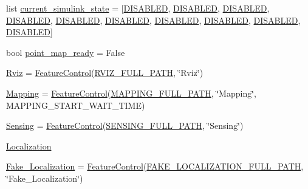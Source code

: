 \begin{DoxyCompactItemize}
list \hyperlink{namespacerp__manager_a85cdd1b22b56bd5cc90234794b44872c}{current\+\_\+simulink\+\_\+state} = \mbox{[}\hyperlink{namespacerp__manager_af85e17f72f768eba5168eba56041bd69}{D\+I\+S\+A\+B\+L\+ED}, \hyperlink{namespacerp__manager_af85e17f72f768eba5168eba56041bd69}{D\+I\+S\+A\+B\+L\+ED}, \hyperlink{namespacerp__manager_af85e17f72f768eba5168eba56041bd69}{D\+I\+S\+A\+B\+L\+ED}, \hyperlink{namespacerp__manager_af85e17f72f768eba5168eba56041bd69}{D\+I\+S\+A\+B\+L\+ED}, \hyperlink{namespacerp__manager_af85e17f72f768eba5168eba56041bd69}{D\+I\+S\+A\+B\+L\+ED}, \hyperlink{namespacerp__manager_af85e17f72f768eba5168eba56041bd69}{D\+I\+S\+A\+B\+L\+ED}, \hyperlink{namespacerp__manager_af85e17f72f768eba5168eba56041bd69}{D\+I\+S\+A\+B\+L\+ED}, \hyperlink{namespacerp__manager_af85e17f72f768eba5168eba56041bd69}{D\+I\+S\+A\+B\+L\+ED}, \hyperlink{namespacerp__manager_af85e17f72f768eba5168eba56041bd69}{D\+I\+S\+A\+B\+L\+ED}, \hyperlink{namespacerp__manager_af85e17f72f768eba5168eba56041bd69}{D\+I\+S\+A\+B\+L\+ED}\mbox{]}
\item 
bool \hyperlink{namespacerp__manager_a4eb11cbe8e6db21cbbf9855db440635c}{point\+\_\+map\+\_\+ready} = False
\item 
\hyperlink{namespacerp__manager_af20e1a3af6f948381fd6cf62eea8428d}{Rviz} = \hyperlink{classFeatureControl_1_1FeatureControl}{Feature\+Control}(\hyperlink{namespacerp__manager_a4b6881a6710271456550e946aa632115}{R\+V\+I\+Z\+\_\+\+F\+U\+L\+L\+\_\+\+P\+A\+TH}, \char`\"{}Rviz\char`\"{})
\item 
\hyperlink{namespacerp__manager_a09e73c9af6b8dae0a30b9137bf64f78c}{Mapping} = \hyperlink{classFeatureControl_1_1FeatureControl}{Feature\+Control}(\hyperlink{namespacerp__manager_af7dfe82383bf37c2c7990a430fd30ae2}{M\+A\+P\+P\+I\+N\+G\+\_\+\+F\+U\+L\+L\+\_\+\+P\+A\+TH}, \char`\"{}Mapping\char`\"{}, M\+A\+P\+P\+I\+N\+G\+\_\+\+S\+T\+A\+R\+T\+\_\+\+W\+A\+I\+T\+\_\+\+T\+I\+ME)
\item 
\hyperlink{namespacerp__manager_a96726b99cc68f4ab799319275c9d15c8}{Sensing} = \hyperlink{classFeatureControl_1_1FeatureControl}{Feature\+Control}(\hyperlink{namespacerp__manager_af912fb7c706707b4b2a06ba4cf4a5d24}{S\+E\+N\+S\+I\+N\+G\+\_\+\+F\+U\+L\+L\+\_\+\+P\+A\+TH}, \char`\"{}Sensing\char`\"{})
\item 
\hyperlink{namespacerp__manager_a74726f38318729f38449240240efaae5}{Localization}
\item 
\hyperlink{namespacerp__manager_a67b92cded2b796d9f50a73c53191dfd5}{Fake\+\_\+\+Localization} = \hyperlink{classFeatureControl_1_1FeatureControl}{Feature\+Control}(\hyperlink{namespacerp__manager_ad7b467e777f8d6cdf79d68ac4e2cf01b}{F\+A\+K\+E\+\_\+\+L\+O\+C\+A\+L\+I\+Z\+A\+T\+I\+O\+N\+\_\+\+F\+U\+L\+L\+\_\+\+P\+A\+TH}, \char`\"{}Fake\+\_\+\+Localization\char`\"{})

\end{DoxyCompactItemize}
